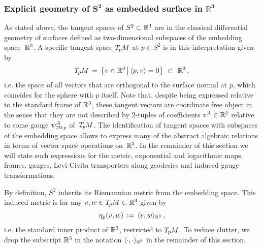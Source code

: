\subsubsection*{Explicit geometry of $\boldsymbol{S^2}$ as embedded surface in $\boldsymbol{\mathds{R}^3}$}
As stated above, the tangent spaces of $S^2 \subset \mathbb{R}^3$ are in the classical differential geometry of surfaces defined as two-dimensional subspaces of the embedding space~$\mathbb{R}^3$.
A specific tangent space $T_{\mkern-1.5mu p}\mkern-.5muM$ at $p\in S^2$ is in this interpretation given by
\begin{align}
    T_{\mkern-1.5mu p}\mkern-.5muM \,=\, \big\{ v\in\mathbb{R}^3 \,\big|\, \langle p,v \rangle = 0 \big\} \ \subset\ \mathbb{R}^3 \,,
\end{align}
i.e. the space of all vectors that are orthogonal to the surface normal at $p$, which coincides for the sphere with $p$ itself.
Note that, despite being expressed relative to the standard frame of $\mathbb{R}^3$, these tangent vectors are coordinate free object in the sense that they are not described by 2-tuples of coefficients $v^A \in \mathbb{R}^2$ relative to some gauge $\psiTMp^A$ of~$T_{\mkern-1.5mu p}\mkern-.5muM$.
The identification of tangent spaces with subspaces of the embedding space allows to express many of the abstract algebraic relations in terms of vector space operations on~$\mathbb{R}^3$.
In the remainder of this section we will state such expressions for the metric, exponential and logarithmic maps, frames, gauges, Levi-Civita transporters along geodesics and induced gauge transformations.


By definition, $S^2$ inherits its Riemannian metric from the embedding space.
This induced metric is for any $v,w \in T_{\mkern-1.5mu p}\mkern-.5muM \subset \mathbb{R}^3$ given by
\begin{align}\label{eq:spherical_embedding_metric_explicit}
    \eta_p(v,w) \,:=\, \langle v,w \rangle_{\mathbb{R}^3} \,,
\end{align}
i.e. the standard inner product of $\mathbb{R}^3$, restricted to $T_{\mkern-1.5mu p}\mkern-.5muM$.
To reduce clutter, we drop the subscript $\mathbb{R}^3$ in the notation $\langle \cdot,\cdot \rangle_{\mathbb{R}^3}$ in the remainder of this section.



